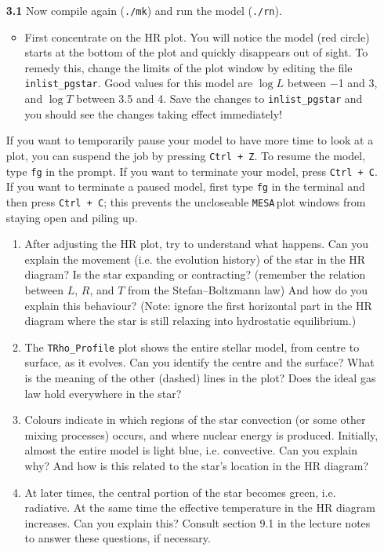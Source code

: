 \documentclass[11pt,a4paper]{article}
\newcommand{\MESA}{\texttt{MESA}\,}
\begin{document}
\begin{enumerate}

\item[\bf{3.1}] Now compile again (\verb|./mk|) and run the model (\verb|./rn|). 
\begin{itemize}
  \item First concentrate on the HR plot. You will notice the model (red circle) starts at the bottom of the plot and quickly disappears out of sight. 
  To remedy this, change the limits of the plot window by editing the file \verb|inlist_pgstar|. Good values for this model are $\log L$ between $-$1 and 3, and $\log T$ between 3.5 and 4. Save the changes to \verb|inlist_pgstar| and you should see the changes taking effect immediately!

\end{itemize}


\begin{tcolorbox}[protipbox]
If you want to temporarily pause your model to have more time to look at a plot, you can suspend the job by pressing \texttt{Ctrl + Z}. To resume the model, type \texttt{fg} in the prompt. If you want to terminate your model, press \texttt{Ctrl + C}. If you want to terminate a paused model, first type \texttt{fg} in the terminal and then press \texttt{Ctrl + C}; this prevents the uncloseable \MESA plot windows from staying open and piling up. 
\end{tcolorbox}


\begin{enumerate}

\item After adjusting the HR plot, try to understand what happens. Can you explain the movement (i.e. the evolution history) of the star in the HR diagram? Is the star expanding or contracting? (remember the relation between $L$, $R$, and $T$ from the Stefan–Boltzmann law) And how do you explain this behaviour? (Note: ignore the first horizontal part in the HR diagram where the star is still relaxing into hydrostatic equilibrium.)

\item The \verb|TRho_Profile| plot shows the entire stellar model, from centre to surface, as it evolves. Can you identify the centre and the surface? What is the meaning of the other (dashed) lines in the plot? Does the ideal gas law hold everywhere in the star?

\item Colours indicate in which regions of the star convection (or some other mixing processes) occurs, and where nuclear energy is produced. Initially, almost the entire model is light blue, i.e. convective. Can you explain why? And how is this related to the star's location in the HR diagram?
\item At later times, the central portion of the star becomes green, i.e. radiative. At the same time the effective temperature in the HR diagram increases. Can you explain this? Consult section 9.1 in the lecture notes to answer these questions, if necessary.


\end{enumerate}
\end{enumerate}
\end{document}
